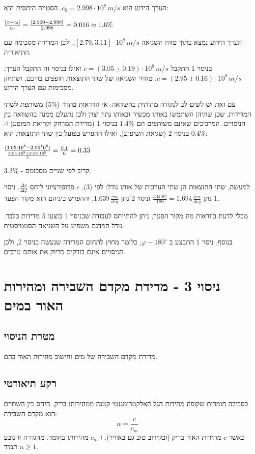 \documentclass[14pt]{extarticle}
\makeatletter
\newenvironment{lefteqs}{%
    \begin{english}%
    \begin{flushleft}%
    \renewcommand{\arraystretch}{1.3}%
    $\begin{array}{@{}l@{}}%
}{%
    \end{array}$%
    \end{flushleft}%
    \end{english}%
}
\makeatother
\begin{document}
הערך הידוע הוא $c_0 = 2.998 \cdot 10^8\,m/s$. הסטייה היחסית היא:
\begin{lefteqs}
    \frac{\left|c - c_0\right|}{c_0} = \frac{\left|2.950 - 2.998\right|}{2.998} = 0.016 \approx 1.6\%
\end{lefteqs}
הערך הידוע נמצא בתוך טווח השגיאה $[2.79, 3.11] \cdot 10^8\,m/s$, ולכן המדידה מסכימה עם התיאוריה.

בניסוי 1 התקבל $c = (3.05 \pm 0.19) \cdot 10^8\,m/s$ ואילו בניסוי זה התקבל הערך:
$c = (2.95 \pm 0.16) \cdot 10^8\,m/s$. טווחי השגיאה של שתי התוצאות חופפים ברובם, ושתיהן מסכימות עם
הערך הידוע.

עם זאת יש לשים לב לנקודה מהותית בהשוואה: אי-הוודאות בתדר ($5\%$) משותפת לשתי המדידות,
שכן שתיהן השתמשו באותו מכשיר ובאותו נתון יצרן ולכן נתעלם ממנה בהשוואה בין הניסויים.
המרכיבים שאינם משותפים הם $1.4\%$ בניסוי 1 (מדידת המרחק וקריאת המופע) ו-$0.4\%$ בניסוי 2
(שגיאת השיפוע), ואילו ההפרש בפועל בין שתי התוצאות הוא:
\begin{lefteqs}
    \frac{|3.05 \cdot 10^8 - 2.95 ^ 10^8|}{\frac{3.05 \cdot 10^8 + 2.95 \cdot 10^8}{2}} = \frac{0.1}{6} = 0.33
\end{lefteqs}

$3.3\%$ - קרוב לפי שניים מסכומם.

למעשה, שתי התוצאות הן שתי הערכות של אותו גודל: לפי (3), $c$ פרופורציוני ליחס
$\frac{\Delta x}{\Delta \varphi}$. ניסוי 1 נתן $\frac{304.92}{180} = 1.694\,\frac{cm}{deg}$ וניסוי 2 נתן
$1.639\,\frac{cm}{deg}$, וההפרש ביניהם הוא מקור הפער.

מבלי לדעת בוודאות מה מקור הפער, ניתן להתייחס לעבודה שבניסוי 1 בוצעו 5 מדידות בלבד. גודל המדגם משפיע על השגיאה הסטטיסטית.

בנוסף, ניסוי 1 התבצע ב $\varphi - 180^{\circ}$, כלומר מחוץ לתחום המדידה שנעשה בניסוי 2, ולכן הניסויים אינם בודקים בדיוק את אותם ערכים.

\newpage
\section*{ניסוי 3 - מדידת מקדם השבירה ומהירות האור במים}

\subsection*{מטרת הניסוי}
מדידת מקדם השבירה של מים וחישוב מהירות האור בהם.

\subsection*{רקע תיאורטי}
בסביבה חומרית שקופה מהירות הגל האלקטרומגנטי קטנה ממהירותו בריק. היחס בין השתיים הוא מקדם השבירה:
\begin{equation}
    n = \frac{c}{c_m}
\end{equation}
כאשר $c$ מהירות האור בריק (ובקירוב טוב גם באוויר), ו-$c_m$ מהירותו בחומר.
מהגדרה זו נובע תמיד $n \geq 1$.
\end{document}
